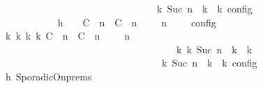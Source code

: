 \begin{isabellebody}
\ \ \ \ \ \ \ \ \ \ \ \ \ \ \ \ \ \ \ \ \ \ \ \ \ \ \ \ {\isasymand}\ {\isasymrho}\ {\isasymin}\ {\isasymlbrakk}\ {\isasymGamma}\isactrlsub k{\isacharcomma}\ Suc\ n\ {\isasymturnstile}\ {\isasymPsi}\isactrlsub k\ {\isasymtriangleright}\ {\isasymPhi}\isactrlsub k\ {\isasymrbrakk}\isactrlsub c\isactrlsub o\isactrlsub n\isactrlsub f\isactrlsub i\isactrlsub g{\isacartoucheclose}\isanewline
\ \ \ \ \ \ \ \ \isamarkupfalse%
\ {\isacharminus}\isanewline
\ \ \ \ \ \ \ \ \ \ \isamarkupfalse%
\ h{}{\isacharcolon}\ {\isacartoucheopen}{\isasymrho}\ {\isasymin}\ {\isasymlbrakk}\ {\isacharparenleft}{\isacharparenleft}C\ {\isasymUp}\ n{\isacharparenright}\ {\isacharhash}\ {\isacharparenleft}C\ {\isasymDown}\ n\ {\isacharat}\ {\isasymtau}{\isacharparenright}\ {\isacharhash}\ {\isasymGamma}{\isacharparenright}{\isacharcomma}\ n\ {\isasymturnstile}\ {\isasymPsi}\ {\isasymtriangleright}\ {\isasymPhi}\ {\isasymrbrakk}\isactrlsub c\isactrlsub o\isactrlsub n\isactrlsub f\isactrlsub i\isactrlsub g{\isacartoucheclose}\isanewline
\ \ \ \ \ \ \ \ \ \ \isamarkupfalse%
\ {\isacartoucheopen}{\isasymexists}{\isasymGamma}\isactrlsub k\ {\isasymPsi}\isactrlsub k\ {\isasymPhi}\isactrlsub k\ k{\isachardot}\ {\isacharparenleft}{\isacharparenleft}{\isacharparenleft}{\isacharparenleft}C\ {\isasymUp}\ n{\isacharparenright}\ {\isacharhash}\ {\isacharparenleft}C\ {\isasymDown}\ n\ {\isacharat}\ {\isasymtau}{\isacharparenright}\ {\isacharhash}\ {\isasymGamma}{\isacharparenright}{\isacharcomma}\ n\ {\isasymturnstile}\ {\isasymPsi}\ {\isasymtriangleright}\ {\isasymPhi}{\isacharparenright}\isanewline
\ \ \ \ \ \ \ \ \ \ \ \ \ \ \ \ \ \ \ \ \ \ \ \ \ \ \ \ \ \ \ \ \ \ \ \ {\isasymhookrightarrow}\isactrlbsup k\isactrlesup \ {\isacharparenleft}{\isasymGamma}\isactrlsub k{\isacharcomma}\ Suc\ n\ {\isasymturnstile}\ {\isasymPsi}\isactrlsub k\ {\isasymtriangleright}\ {\isasymPhi}\isactrlsub k{\isacharparenright}{\isacharparenright}\isanewline
\ \ \ \ \ \ \ \ \ \ \ \ \ \ \ \ \ \ \ \ \ \ \ \ \ \ \ \ \ {\isasymand}\ {\isasymrho}\ {\isasymin}\ {\isasymlbrakk}\ {\isasymGamma}\isactrlsub k{\isacharcomma}\ Suc\ n\ {\isasymturnstile}\ {\isasymPsi}\isactrlsub k\ {\isasymtriangleright}\ {\isasymPhi}\isactrlsub k\ {\isasymrbrakk}\isactrlsub c\isactrlsub o\isactrlsub n\isactrlsub f\isactrlsub i\isactrlsub g{\isacartoucheclose}\isanewline
\ \ \ \ \ \ \ \ \ \ \ \ \isamarkupfalse%
\ h{}\ SporadicOn{\isachardot}prems\ \isamarkupfalse%

\end{isabellebody}
